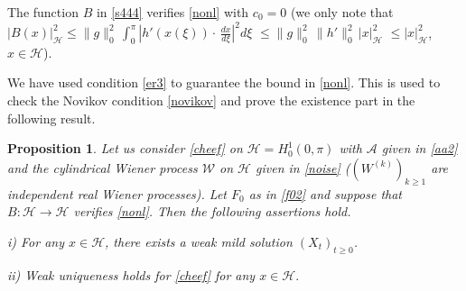 \documentclass[preprint]{imsart}
\newtheorem{proposition}[theorem]{Proposition}
\def\A{\mathcal A}
\def\H{\mathcal  H}
\def\W{\mathcal  W}
\begin{document}
 
 The function $B$ in \eqref{s444}  verifies    \eqref{nonl}  with $c_0 = 0$
 (we only note that  $|B(x)|_{\H}^2 \le \| g\|_{0}^2 \, \int_0^{\pi} |h '(x(\xi)) \cdot\,  \frac{dx}{d \xi}|^2 d \xi $ $\le \| g\|_{0}^2 \, \| h'\|_{0}^2 \, |x|_{\H}^2$ $\le  |x|_{\H}^2$, $x \in \H$). 
  
 We have used  condition \eqref{er3} to guarantee the bound  in \eqref{nonl}. This is   used to check the  Novikov condition \eqref{novikov} and prove the existence part in the following result.
\begin{proposition} \label{well1} 
 Let us consider \eqref{cheef} on    
 $\H= H^1_0(0, \pi)$ with 
  $\A$ given in \eqref{aa2} and the cylindrical Wiener process $\W$ on $\H$ given in \eqref{noise} ($(W^{(k)})_{k \ge 1
  }$ are independent real Wiener processes). 
  Let  $F_0$ as  in \eqref{f02} and  suppose that   $B: \H \to \H$   verifies  \eqref{nonl}. 
   Then the following assertions hold.
  
 i) For any $x \in \H$,  there exists a weak mild solution $(X_t)_{t \ge 0 }$.
 
ii)  Weak uniqueness holds for \eqref{cheef} for any $x \in \H.$
 \end{proposition}
\end{document}
